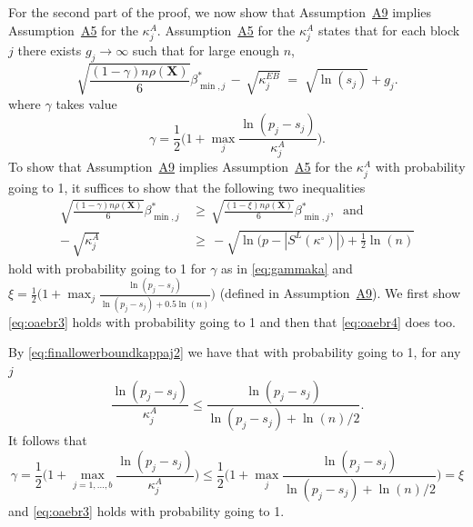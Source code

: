 \documentclass[
  12pt]{article}
\newcommand{\bX}{\mathbf{X}}
\begin{document}
For the second part of the proof,
we now show that Assumption~\hyperlink{lab:A9}{A9} implies Assumption~\hyperlink{lab:A5}{A5} for the $\kappa^{A}_j$. Assumption~\hyperlink{lab:A5}{A5} for the $\kappa_j^{A}$ states that for each block $j$ there exists $g_j\to \infty$ such that for large enough $n$,
    \begin{equation*}
        \sqrt{\frac{(1-\gamma) n\rho(\bX)}{6}}{{\beta_{\min,j}^*}} \,- \,\sqrt{\kappa^{EB}_j} \;=\; \sqrt{\ln(s_j)} + g_j .
    \end{equation*}
where $\gamma$ takes value
\begin{equation}\label{eq:gammaka}
    \gamma=\frac12\Big(1+\max_j\frac{\ln(p_j-s_j)}{\kappa^{A}_j}\Big).
\end{equation}
To show that Assumption~\hyperlink{lab:A9}{A9} implies Assumption~\hyperlink{lab:A5}{A5} for the $\kappa_j^{A}$ with probability going to 1, it suffices to show that the following two inequalities
\begin{align}
    \sqrt{\frac{ (1-\gamma)n\rho(\bX)}{6}}{\beta_{\min,j}^*} \,&\geq \,  \sqrt{\frac{ (1-\xi)n\rho(\bX)}{6}}{\beta_{\min,j}^*}, \label{eq:oaebr3}\;\;\text{and} \\
    - \,\sqrt{\kappa^{A}_j} \,&\geq \,-\sqrt{\ln\bigg(p-|S^{L}(\kappa^{\circ})|\bigg)+\frac12\ln(n)}\label{eq:oaebr4}
\end{align}
hold with probability going to 1 for $\gamma$ as in \eqref{eq:gammaka} and $\xi=\frac12\big(1+\max_j \frac{\ln(p_j-s_j)}{\ln(p_j-s_j)+0.5\ln(n)}\big)$ (defined in Assumption~\hyperlink{lab:A9}{A9}). We first show \eqref{eq:oaebr3} holds with probability going to 1 and then that \eqref{eq:oaebr4} does too.

By \eqref{eq:finallowerboundkappaj2} we have that with probability going to 1, for any $j$
\begin{equation*}
\frac{\ln(p_j-s_j)}{\kappa^{A}_j} 
    \leq  \frac{\ln(p_j-s_j)}{\ln(p_j-s_j)+\ln(n)/2}.
\end{equation*}
It follows that
\begin{equation*}
    \gamma=\frac12\Big(1+\max_{j=1, \ldots,b}\frac{\ln(p_j-s_j)}{\kappa^ A_j}\Big) \leq \frac12\big(1+\max_j \frac{\ln(p_j-s_j)}{\ln(p_j-s_j)+\ln(n)/2}\big)=\xi
\end{equation*}
and \eqref{eq:oaebr3} holds with probability going to 1.
\end{document}

